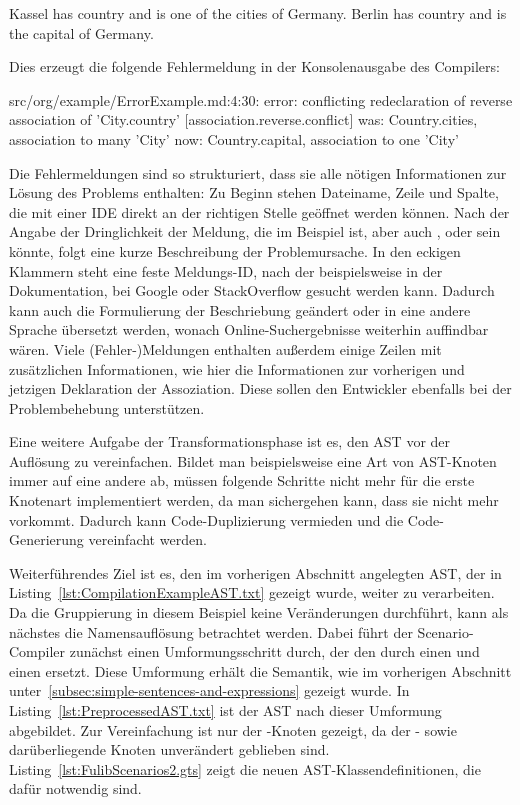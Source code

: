 \begin{codeblock}
    Kassel has country and is one of the cities of Germany.
    Berlin has country and is the capital of Germany.
\end{codeblock}

Dies erzeugt die folgende Fehlermeldung in der Konsolenausgabe des Compilers:

\begin{codeblock}
    src/org/example/ErrorExample.md:4:30: error: conflicting redeclaration of reverse association of 'City.country' [association.reverse.conflict]
    was: Country.cities, association to many 'City'
    now: Country.capital, association to one 'City'
\end{codeblock}

Die Fehlermeldungen sind so strukturiert, dass sie alle nötigen Informationen zur Lösung des Problems enthalten:
Zu Beginn stehen Dateiname, Zeile und Spalte, die mit einer IDE direkt an der richtigen Stelle geöffnet werden können.
Nach der Angabe der Dringlichkeit der Meldung, die im Beispiel  ist, aber auch ,  oder  sein könnte, folgt eine kurze Beschreibung der Problemursache.
In den eckigen Klammern steht eine feste Meldungs-ID, nach der beispielsweise in der Dokumentation, bei Google oder StackOverflow gesucht werden kann.
Dadurch kann auch die Formulierung der Beschriebung geändert oder in eine andere Sprache übersetzt werden,
wonach Online-Suchergebnisse weiterhin auffindbar wären.
Viele (Fehler-)Meldungen enthalten außerdem einige Zeilen mit zusätzlichen Informationen,
wie hier die Informationen zur vorherigen und jetzigen Deklaration der Assoziation.
Diese sollen den Entwickler ebenfalls bei der Problembehebung unterstützen.

Eine weitere Aufgabe der Transformationsphase ist es, den AST vor der Auflösung zu vereinfachen.
Bildet man beispielsweise eine Art von AST-Knoten immer auf eine andere ab,
müssen folgende Schritte nicht mehr für die erste Knotenart implementiert werden,
da man sichergehen kann, dass sie nicht mehr vorkommt.
Dadurch kann Code-Duplizierung vermieden und die Code-Generierung vereinfacht werden.

Weiterführendes Ziel ist es, den im vorherigen Abschnitt angelegten AST, der in Listing~\ref{lst:CompilationExampleAST.txt} gezeigt wurde, weiter zu verarbeiten.
Da die Gruppierung in diesem Beispiel keine Veränderungen durchführt, kann als nächstes die Namensauflösung betrachtet werden.
Dabei führt der Scenario-Compiler zunächst einen Umformungsschritt durch, der den  durch einen  und einen  ersetzt.
Diese Umformung erhält die Semantik, wie im vorherigen Abschnitt unter~\ref{subsec:simple-sentences-and-expressions} gezeigt wurde.
In Listing~\ref{lst:PreprocessedAST.txt} ist der AST nach dieser Umformung abgebildet.
Zur Vereinfachung ist nur der -Knoten gezeigt, da der - sowie darüberliegende Knoten unverändert geblieben sind.
Listing~\ref{lst:FulibScenarios2.gts} zeigt die neuen AST-Klassendefinitionen, die dafür notwendig sind.

